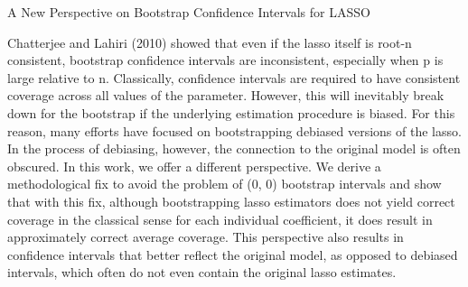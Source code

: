 A New Perspective on Bootstrap Confidence Intervals for LASSO

Chatterjee and Lahiri (2010) showed that even if the lasso itself is root-n consistent, bootstrap confidence intervals are inconsistent, especially when p is large relative to n. Classically, confidence intervals are required to have consistent coverage across all values of the parameter. However, this will inevitably break down for the bootstrap if the underlying estimation procedure is biased. For this reason, many efforts have focused on bootstrapping debiased versions of the lasso. In the process of debiasing, however, the connection to the original model is often obscured. In this work, we offer a different perspective. We derive a methodological fix to avoid the problem of (0, 0) bootstrap intervals and show that with this fix, although bootstrapping lasso estimators does not yield correct coverage in the classical sense for each individual coefficient, it does result in approximately correct average coverage. This perspective also results in confidence intervals that better reflect the original model, as opposed to debiased intervals, which often do not even contain the original lasso estimates.
